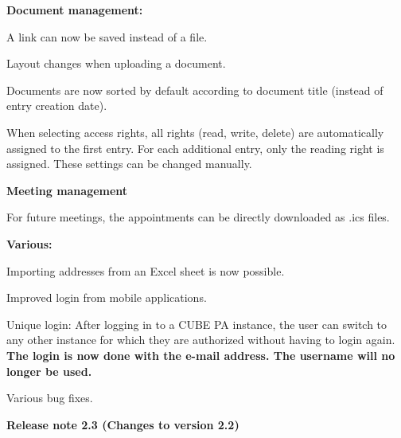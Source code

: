 \textbf{Document management:}
\begin{compactitem}
	\item A link can now be saved instead of a file.
	\item Layout changes when uploading a document.
	\item Documents are now sorted by default according to document title (instead of entry creation date).
	\item When selecting access rights, all rights (read, write, delete) are automatically assigned to the first entry. For each additional entry, only the reading right is assigned. These settings can be changed manually.
\end{compactitem}
\textbf{Meeting management}
\begin{compactitem}
	\item For future meetings, the appointments can be directly downloaded as .ics files.
\end{compactitem}
\textbf{Various:}
\begin{compactitem}
	\item Importing addresses from an Excel sheet is now possible.
	\item Improved login from mobile applications.
	\item Unique login: After logging in to a CUBE PA instance, the user can switch to any other instance for which they are authorized without having to login again. \textbf{The login is now done with the e-mail address. The username will no longer be used.}
	\item Various bug fixes.
\end{compactitem}

\vspace{\baselineskip}

\textbf{Release note 2.3 (Changes to version 2.2)} \\

